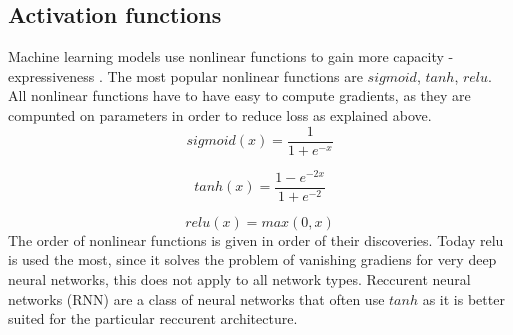 \documentclass[times, utf8, diplomski]{fer}
\begin{document}
\subsection{Activation functions}
Machine learning models use nonlinear functions to gain more capacity - expressiveness
. The most popular nonlinear functions are $sigmoid$, $tanh$, $relu$. All nonlinear functions have to have easy to compute gradients, as they are compunted on parameters in order to reduce loss as explained above. 
\begin{equation} \label{eq:sigmoid}
	sigmoid(x) = \frac{1}{1 + e^{-x}}
\end{equation}

\begin{equation} \label{eq:tanh}
	tanh(x) = \frac{1 - e^{-2x}}{1 + e^{-2}}
\end{equation}

\begin{equation} \label{eq:relu}
	relu(x) = max(0, x)
\end{equation}
The order of nonlinear functions is given in order of their discoveries. Today relu is used the most, since it solves the problem of vanishing gradiens for very deep neural networks, this does not apply to all network types. Reccurent neural networks (RNN) are a class of neural networks that often use $tanh$ as it is better suited for the particular reccurent architecture.
\end{document}
